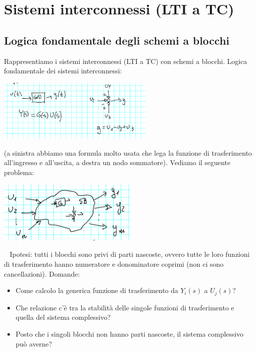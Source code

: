 \section{Sistemi interconnessi (LTI a TC)}
\subsection{Logica fondamentale degli schemi a blocchi}
Rappresentiamo i sistemi interconnessi (LTI a TC) con schemi a blocchi.\newline
\newline
Logica fondamentale dei sistemi interconnessi: 
\begin{center}
    \includegraphics[height=3cm]{../lezione11/img1.PNG}
\end{center}
(a sinistra abbiamo una formula molto usata che lega la funzione di trasferimento all'ingresso e all'uscita, a destra un nodo sommatore).\newline
\newline
Vediamo il seguente problema:
\begin{center}
    \includegraphics[height=3cm]{../lezione11/img2.PNG}
\end{center}
\ \newline
Ipotesi: tutti i blocchi sono privi di parti nascoste, ovvero tutte le loro funzioni di trasferimento hanno numeratore e donominatore coprimi (non ci sono cancellazioni).\newline
Domande:
\begin{itemize}
    \item Come calcolo la generica funzione di trasferimento da $Y_i(s)$ a $U_j(s)$?
    \item Che relazione c'è tra la stabilità delle singole funzioni di trasferimento e quella del sistema complessivo?
    \item Posto che i singoli blocchi non hanno parti nascoste, il sistema complessivo può averne?
\end{itemize}
